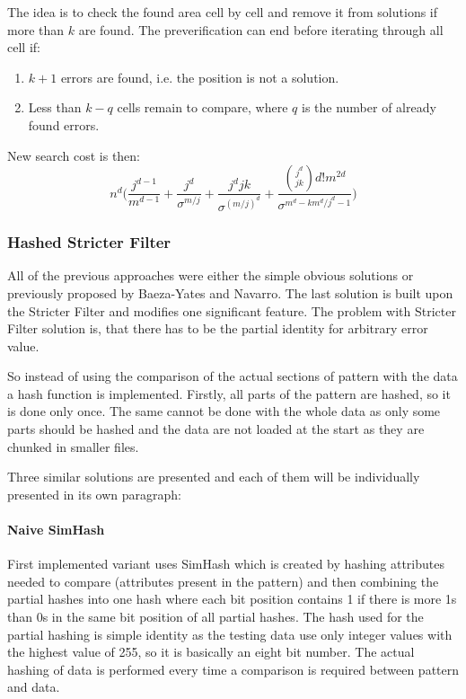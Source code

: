 The idea is to check the found area cell by cell and remove it from solutions if more than $k$ are found. The preverification can end before iterating through all cell if:

\begin{enumerate}
\item $k+1$ errors are found, i.e. the position is not a solution.
\item Less than $k - q$ cells remain to compare, where $q$ is the number of already found errors.
\end{enumerate}

New search cost is then: $$ n^d \Big(\frac{j^{d-1}}{m^{d-1}} + \frac{j^d}{\sigma^{m/j}} + \frac{j^djk}{\sigma^{(m/j)^d}} + \frac{{j^d \choose jk} d! m^{2d} }{\sigma^{m^d - km^d/j^d -1}}\Big) $$

\subsubsection{Hashed Stricter Filter }
All of the previous approaches were either the simple obvious solutions or previously proposed by Baeza-Yates and Navarro. The last solution is built upon the Stricter Filter and modifies one significant feature. The problem with Stricter Filter solution is, that there has to be the partial identity for arbitrary error value.

So instead of using the comparison of the actual sections of pattern with the data a hash function is implemented. Firstly, all parts of the pattern are hashed, so it is done only once. The same cannot be done with the whole data as only some parts should be hashed and the data are not loaded at the start as they are chunked in smaller files.

Three similar solutions are presented and each of them will be individually presented in its own paragraph:

\paragraph{Naive SimHash} First implemented variant uses SimHash which is created by hashing attributes needed to compare (attributes present in the pattern) and then combining the partial hashes into one hash where each bit position contains 1 if there is more 1s than 0s in the same bit position of all partial hashes. The hash used for the partial hashing is simple identity as the testing data use only integer values with the highest value of 255, so it is  basically an eight bit number. The actual hashing of data is performed every time a comparison is required between pattern and data.


